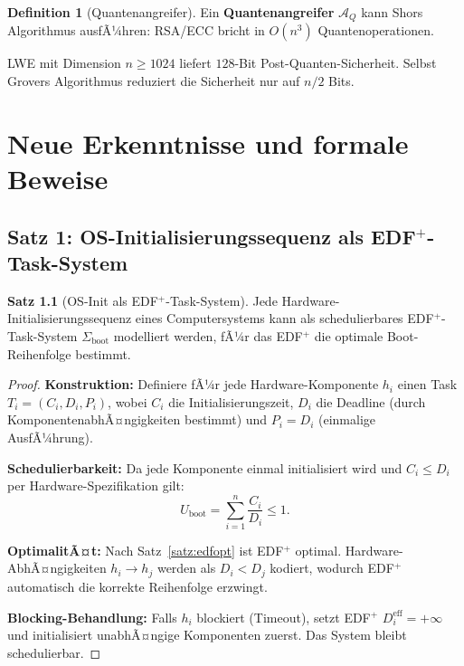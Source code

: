 ﻿\documentclass[a4paper,12pt]{scrreprt}
\theoremstyle{definition}
\newtheorem{definition}{Definition}[chapter]
\newtheorem{satz}{Satz}[chapter]
\begin{document}
	\begin{definition}[Quantenangreifer]
		Ein \textbf{Quantenangreifer} $\mathcal{A}_Q$ kann Shors Algorithmus
		\cite{Shor1994} ausfÃ¼hren: RSA/ECC bricht in $O(n^3)$ Quantenoperationen.
	\end{definition}
	
	LWE mit Dimension $n \geq 1024$ liefert $128$-Bit Post-Quanten-Sicherheit.
	Selbst Grovers Algorithmus reduziert die Sicherheit nur auf $n/2$ Bits.
	
	\chapter{Neue Erkenntnisse und formale Beweise}
	
	\section{Satz 1: OS-Initialisierungssequenz als \texorpdfstring{EDF$^+$}{EDF+}-Task-System}
	
	\begin{satz}[OS-Init als EDF$^+$-Task-System]\label{satz:os_init}
		Jede Hardware-Initialisierungssequenz eines Computersystems kann als
		schedulierbares EDF$^+$-Task-System $\Sigma_{\mathrm{boot}}$ modelliert werden,
		fÃ¼r das EDF$^+$ die optimale Boot-Reihenfolge bestimmt.
	\end{satz}
	
	\begin{proof}
		\textbf{Konstruktion:} Definiere fÃ¼r jede Hardware-Komponente $h_i$
		einen Task $T_i = (C_i, D_i, P_i)$, wobei $C_i$ die Initialisierungszeit,
		$D_i$ die Deadline (durch KomponentenabhÃ¤ngigkeiten bestimmt) und
		$P_i = D_i$ (einmalige AusfÃ¼hrung).
		
		\textbf{Schedulierbarkeit:} Da jede Komponente einmal initialisiert
		wird und $C_i \leq D_i$ per Hardware-Spezifikation gilt:
		\[
		U_{\mathrm{boot}} = \sum_{i=1}^{n} \frac{C_i}{D_i} \leq 1.
		\]
		
		\textbf{OptimalitÃ¤t:} Nach Satz~\ref{satz:edfopt} ist EDF$^+$ optimal.
		Hardware-AbhÃ¤ngigkeiten $h_i \to h_j$ werden als $D_i < D_j$ kodiert,
		wodurch EDF$^+$ automatisch die korrekte Reihenfolge erzwingt.
		
		\textbf{Blocking-Behandlung:} Falls $h_i$ blockiert (Timeout), setzt
		EDF$^+$ $D_i^{\mathrm{eff}} = +\infty$ und initialisiert unabhÃ¤ngige
		Komponenten zuerst. Das System bleibt schedulierbar.
	\end{proof}
	
\end{document}
